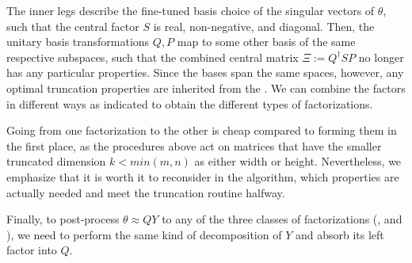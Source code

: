 The inner legs describe the fine-tuned basis choice of the singular vectors of $\theta$, such that the central factor $S$ is real, non-negative, and diagonal.
%
Then, the unitary basis transformations $Q, P$ map to some other basis of the same respective subspaces, such that the combined central matrix $\Xi := Q^\dagger S P$ no longer has any particular properties.
%
Since the bases span the same spaces, however, any optimal truncation properties are inherited from the .
%
We can combine the factors in different ways as indicated to obtain the different types of factorizations.



Going from one factorization to the other is cheap compared to forming them in the first place, as the procedures above act on matrices that have the smaller truncated dimension $k <min(m, n)$ as either width or height.
%
Nevertheless, we emphasize that it is worth it to reconsider in the  algorithm, which properties are actually needed and meet the truncation routine halfway.



Finally, to post-process $\theta\approx Q Y$ to any of the three classes of factorizations (,  and ), we need to perform the same kind of decomposition of $Y$ and absorb its left factor into $Q$.